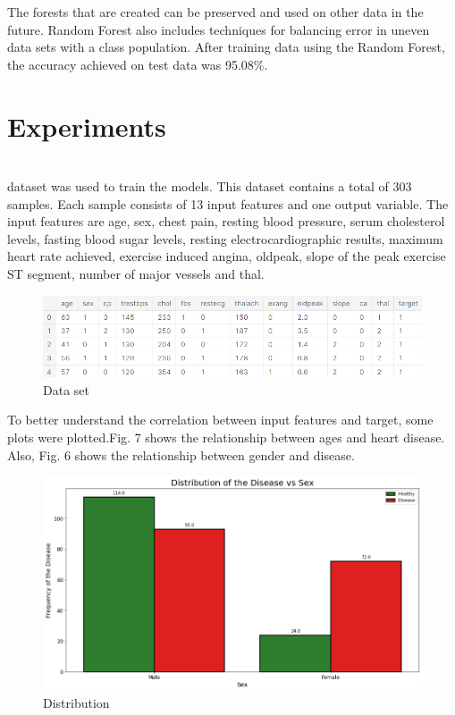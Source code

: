 \documentclass{article}
\begin{document}
The forests that are created can be preserved and used on other data in the future. Random Forest also includes techniques for balancing error in uneven data sets with a class population. After training data using the Random Forest, the accuracy achieved on test data was 95.08\%.

\section{Experiments}\\
\cite{linkdata} dataset was used to train the models. This dataset contains a total of 303 samples. Each sample consists of 13 input features and one output variable. The input features are age, sex, chest pain, resting blood pressure, serum cholesterol levels, fasting blood sugar levels, resting electrocardiographic results, maximum heart rate achieved, exercise induced angina, oldpeak, slope of the peak exercise ST segment, number of major vessels and thal.

\begin{figure}[h]
    \centering
    \includegraphics[scale=0.70]{table.png}
    \caption{Data set}
    \label{fig:dataset}
\end{figure}

To better understand the correlation between input features and target, some plots were plotted.Fig. 7 shows the relationship between ages and heart disease. Also, Fig. 6 shows the relationship between gender and disease. 

\begin{figure}[h]
    \centering
    \includegraphics[scale=0.30]{__results___11_1.png}
    \caption{Distribution}
    \label{fig:dis}
\end{figure}
\end{document}
